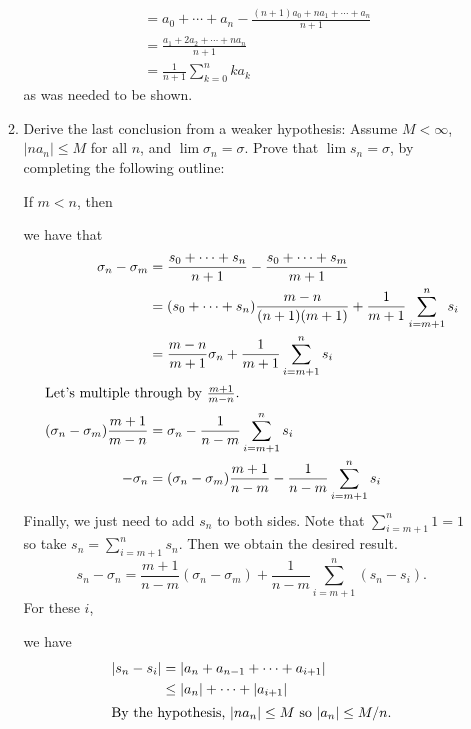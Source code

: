 \begin{enumerate}
\begin{enumerate}[label = (\alph*), ref = \theenumi{} (\alph*)]
\begin{align*}
                     & = a_0 + \cdots + a_n -
                       \frac{(n + 1)a_0 + na_1 + \cdots + a_n}{n + 1}\\
                     & = \frac{a_1 + 2a_2 + \cdots + na_n}{n + 1}\\
                     & = \frac{1}{n + 1}\sum_{k = 0}^nka_k
    \end{align*}
    as was needed to be shown.
  \item
    Derive the last conclusion from a weaker hypothesis: Assume \(M < \infty\),
    \(\lvert na_n\rvert\leq M\) for all \(n\), and \(\lim\sigma_n = \sigma\).
    Prove that \(\lim s_n = \sigma\), by completing the following outline:
    \par\smallskip
    If \(m < n\), then
    \par\smallskip
    {\color{NavyBlue}
      we have that
      \begin{align*}
        \sigma_n - \sigma_m
        & = \frac{s_0 + \cdots + s_n}{n + 1} -
          \frac{s_0 + \cdots + s_m}{m + 1}\\
        & = (s_0 + \cdots + s_n)\frac{m - n}{(n + 1)(m + 1)} +
          \frac{1}{m + 1}\sum_{i = m + 1}^ns_i\\
        & = \frac{m - n}{m + 1}\sigma_n + \frac{1}{m + 1}
          \sum_{i = m + 1}^ns_i\\
        \intertext{Let's multiple through by \(\frac{m + 1}{m - n}\).}
        (\sigma_n - \sigma_m)\frac{m + 1}{m - n}
        & = \sigma_n - \frac{1}{n - m}\sum_{i = m + 1}^ns_i\\
        -\sigma_n & = (\sigma_n - \sigma_m)\frac{m + 1}{n - m} -
                    \frac{1}{n - m}\sum_{i = m + 1}^ns_i
      \end{align*}
      Finally, we just need to add \(s_n\) to both sides.
      Note that \(\sum_{i = m + 1}^n1 = 1\) so take
      \(s_n = \sum_{i = m + 1}^ns_n\).
      Then we obtain the desired result.
    }
    \[
    s_n - \sigma_n = \frac{m + 1}{n - m}(\sigma_n - \sigma_m) +
    \frac{1}{n - m}\sum_{i = m + 1}^n(s_n - s_i).
    \]
    For these \(i\),
    \par\smallskip
    {\color{NavyBlue}
      we have
      \begin{align*}
        \lvert s_n - s_i\rvert
        & = \lvert a_n + a_{n - 1} + \cdots + a_{i + 1}\rvert\\
        & \leq \lvert a_n\rvert + \cdots + \lvert a_{i + 1}\rvert\\
        \intertext{By the hypothesis, \(\lvert na_n\rvert\leq M\) so
        \(\lvert a_n\rvert\leq M/n\).}

\end{align*}}
\end{enumerate}
\end{enumerate}
